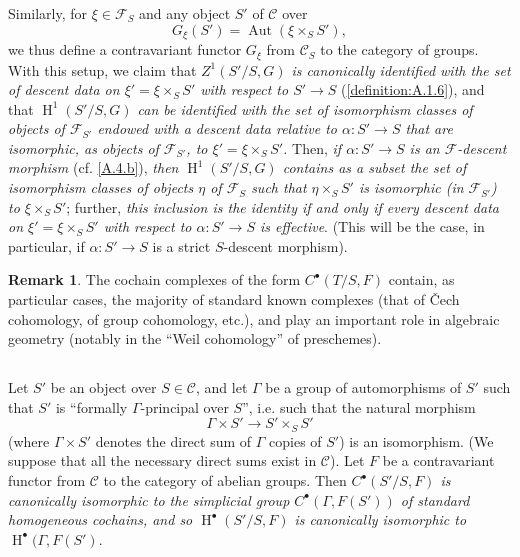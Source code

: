 \documentclass{article}
\theoremstyle{plain}
\theoremstyle{definition}
\newenvironment{example}[1]
  {\renewcommand\theinnercustomexample{#1}\innercustomexample}
  {\endinnercustomexample}
\newtheorem*{remark}{Remark}
\newcommand{\sh}[1]{{\mathscr{#1}}}
\newcommand{\cat}[1]{{\mathcal{#1}}}
\DeclareMathOperator{\Aut}{Aut}
\DeclareMathOperator{\HH}{H}
\newcommand{\oldpage}[1]{\marginpar{\footnotesize$\Big\vert$ \textit{p.~#1}}}
\begin{document}
Similarly, for $\xi\in\sh{F}_S$ and any object $S'$ of $\cat{C}$ over
\[
  G_\xi(S') = \Aut(\xi\times_S S'),
\]
we thus define a contravariant functor $G_\xi$ from $\cat{C}_S$ to the category of
\oldpage{190-14}
groups.
With this setup, we claim that \emph{$Z^1(S'/S,G)$ is canonically identified with the set of descent data on $\xi'=\xi\times_S S'$ with respect to $S'\to S$} (\cref{definition:A.1.6}), and that \emph{$\HH^1(S'/S,G)$ can be identified with the set of isomorphism classes of objects of $\sh{F}_{S'}$ endowed with a descent data relative to $\alpha\colon S'\to S$ that are isomorphic, as objects of $\sh{F}_{S'}$, to $\xi'=\xi\times_S S'$.}
Then, \emph{if $\alpha\colon S'\to S$ is an $\sh{F}$-descent morphism} (cf. \cref{A.4.b}), \emph{then $\HH^1(S'/S,G)$ contains as a subset the set of isomorphism classes of objects $\eta$ of $\sh{F}_S$ such that $\eta\times_S S'$ is isomorphic (in $\sh{F}_{S'}$) to $\xi\times_S S'$};
further, \emph{this inclusion is the identity if and only if every descent data on $\xi'=\xi\times_S S'$ with respect to $\alpha\colon S'\to S$ is effective}.
(This will be the case, in particular, if $\alpha\colon S'\to S$ is a strict $S$-descent morphism).

\begin{remark}
  The cochain complexes of the form $C^\bullet(T/S,F)$ contain, as particular cases, the majority of standard known complexes (that of \v{C}ech cohomology, of group cohomology, etc.), and play an important role in algebraic geometry (notably in the ``Weil cohomology'' of preschemes).
\end{remark}


\subsection{}
\label{A.4.d}

\begin{example}{1}
\label{example:A.4.d}
  Let $S'$ be an object over $S\in\cat{C}$, and let $\Gamma$ be a group of automorphisms of $S'$ such that $S'$ is ``formally $\Gamma$-principal over $S$'', i.e. such that the natural morphism
  \[
    \Gamma\times S' \to S'\times_S S'
  \]
  (where $\Gamma\times S'$ denotes the direct sum of $\Gamma$ copies of $S'$) is an isomorphism.
  (We suppose that all the necessary direct sums exist in $\cat{C}$).
  Let $F$ be a contravariant functor from $\cat{C}$ to the category of abelian groups.
  Then \emph{$C^\bullet(S'/S,F)$ is canonically isomorphic to the simplicial group $C^\bullet(\Gamma,F(S'))$ of standard homogeneous cochains, and so $\HH^\bullet(S'/S,F)$ is canonically isomorphic to $\HH^\bullet(\Gamma,F(S')$}.
\end{example}
\end{document}
